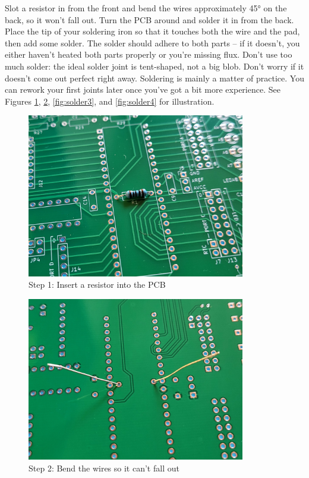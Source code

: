 \documentclass{article}
\begin{document}
Slot a resistor in from the front and bend the wires approximately 45° on the back, so it won't fall out. Turn the PCB around and solder it in from the back. Place the tip of your soldering iron so that it touches both the wire and the pad, then add some solder. The solder should adhere to both parts -- if it doesn't, you either haven't heated both parts properly or you're missing flux. Don't use too much solder: the ideal solder joint is tent-shaped, not a big blob. Don't worry if it doesn't come out perfect right away. Soldering is mainly a matter of practice. You can rework your first joints later once you've got a bit more experience. See Figures \ref{fig:solder1}, \ref{fig:solder2}, \ref{fig:solder3}, and \ref{fig:solder4} for illustration. 
\begin{figure}[htb]
\centering
\includegraphics[width=0.85\textwidth]{Pictures/Solder1.jpg}
\caption{Step 1: Insert a resistor into the PCB}
\label{fig:solder1}
\end{figure}
\begin{figure}[htb]
\centering
\includegraphics[width=0.85\textwidth]{Pictures/Solder2.jpg}
\caption{Step 2: Bend the wires so it can't fall out}
\label{fig:solder2}
\end{figure}
\end{document}
